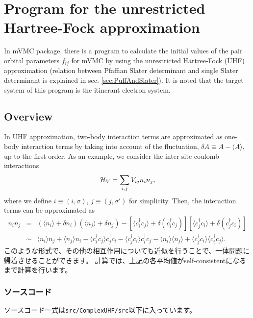\appendix
\chapter{Program for the unrestricted Hartree-Fock approximation}
\label{Ch:URHF}
In mVMC package, there is a program to calculate the initial values of the pair orbital parameters $f_{ij}$ for mVMC 
by using the unrestricted Hartree-Fock (UHF) approximation (relation between Pfaffian Slater determinant and single Slater determinant is explained in sec. \ref{sec:PuffAndSlater}). It is noted that the target system of this program is the itinerant electron system.

\section{Overview}
In UHF approximation, two-body interaction terms are approximated as one-body interaction terms by taking into account of the fluctuation, $\delta A \equiv A-\langle A \rangle$, up to the first order. As an example, we consider the inter-site coulomb interactions 
\begin{equation}
{\cal H}_V = \sum_{i,j}V_{ij} n_ {i}n_{j},
\end{equation}
where we define $i\equiv (i, \sigma)$, $j\equiv (j, \sigma')$ for simplicity. 
Then, the interaction terms can be approximated as
\begin{eqnarray}
n_ {i}n_{j} &=& (\langle n_{i} \rangle +\delta n_i) (\langle n_{j} \rangle +\delta n_j) - \left[ \langle c_{i}^{\dag}c_j \rangle +\delta (c_{i}^{\dag}c_j ) \right] \left[ \langle c_{j}^{\dag}c_i \rangle +\delta (c_{j}^{\dag}c_i )\right] \nonumber\\
&\sim&\langle n_{i} \rangle n_j+\langle n_{j} \rangle  n_i - \langle c_{i}^{\dag}c_j \rangle  c_{j}^{\dag}c_i  -  \langle c_{j}^{\dag}c_i \rangle c_{i}^{\dag}c_j 
-\langle n_{i} \rangle \langle n_j \rangle +  \langle c_{j}^{\dag}c_i \rangle \langle c_{i}^{\dag}c_j \rangle.
\end{eqnarray}
このような形式で、その他の相互作用についても近似を行うことで、一体問題に帰着させることができます。
計算では、上記の各平均値がself-consistentになるまで計算を行います。

\subsection{ソースコード}
ソースコード一式は\verb|src/ComplexUHF/src|以下に入っています。
